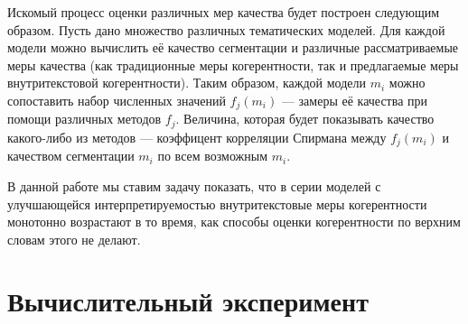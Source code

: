 Искомый процесс оценки различных мер качества будет построен следующим образом. Пусть дано множество различных тематических моделей. Для каждой модели можно вычислить её качество сегментации и различные рассматриваемые меры качества (как традиционные меры когерентности, так и предлагаемые меры внутритекстовой когерентности). Таким образом, каждой модели $m_i$ можно сопоставить набор численных значений $f_j(m_i)$ --- замеры её качества при помощи различных методов $f_j$. Величина, которая будет показывать качество какого-либо из методов --- коэффицент корреляции Спирмана между $f_j(m_i)$ и качеством сегментации $m_i$ по всем возможным $m_i$.

В данной работе мы ставим задачу показать, что в серии моделей с улучшающейся интерпретируемостью внутритекстовые меры когерентности монотонно возрастают в то время, как способы оценки когерентности по верхним словам этого не делают.

\section{Вычислительный эксперимент}

